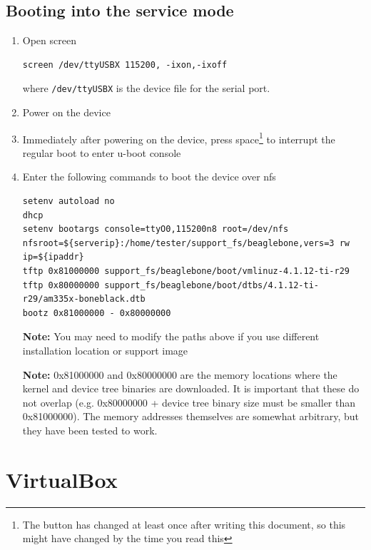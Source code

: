 \documentclass[a4paper,11pt]{article}
\newcommand{\note}{\textbf{Note: }}
\newcommand{\cmd}[1]{\texttt{#1}}
\begin{document}
\subsection{Booting into the service mode}
\label{bbbboot}

\begin{enumerate}
\item Open screen

\begin{lstlisting}
screen /dev/ttyUSBX 115200, -ixon,-ixoff
\end{lstlisting}
where \cmd{/dev/ttyUSBX} is the device file for the serial port.

\item Power on the device

\item Immediately after powering on the device, press space\footnote{The button has changed at least once after writing this document, so this might have changed by the time you read this} to interrupt the regular boot to enter u-boot console

\item Enter the following commands to boot the device over nfs

\begin{lstlisting}
setenv autoload no
dhcp
setenv bootargs console=ttyO0,115200n8 root=/dev/nfs nfsroot=${serverip}:/home/tester/support_fs/beaglebone,vers=3 rw ip=${ipaddr}
tftp 0x81000000 support_fs/beaglebone/boot/vmlinuz-4.1.12-ti-r29
tftp 0x80000000 support_fs/beaglebone/boot/dtbs/4.1.12-ti-r29/am335x-boneblack.dtb
bootz 0x81000000 - 0x80000000
\end{lstlisting}

\note You may need to modify the paths above if you use different installation location or support image

\note 0x81000000 and 0x80000000 are the memory locations where the kernel and device tree binaries are downloaded. It is important that these do not overlap (e.g. 0x80000000 + device tree binary size must be smaller than 0x81000000). The memory addresses themselves are somewhat arbitrary, but they have been tested to work.

\end{enumerate}

\pagebreak

\section{VirtualBox}
\end{document}
